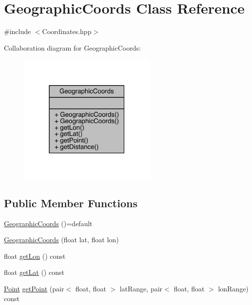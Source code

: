 \hypertarget{class_geographic_coords}{}\section{Geographic\+Coords Class Reference}
\label{class_geographic_coords}


{\ttfamily \#include $<$Coordinates.\+hpp$>$}



Collaboration diagram for Geographic\+Coords\+:\nopagebreak
\begin{figure}[H]
\begin{center}
\leavevmode
\includegraphics[width=195pt]{class_geographic_coords__coll__graph}
\end{center}
\end{figure}
\subsection*{Public Member Functions}
\begin{DoxyCompactItemize}
\item 
\hyperlink{class_geographic_coords_a6e58da78d507551dc7a6c39e6ffb33b3}{Geographic\+Coords} ()=default
\item 
\hyperlink{class_geographic_coords_a5db8168e8754a1eb2d13e3d2c8318cb4}{Geographic\+Coords} (float lat, float lon)
\item 
float \hyperlink{class_geographic_coords_a4e59f2e3ea261e73c33014368770ad21}{get\+Lon} () const
\item 
float \hyperlink{class_geographic_coords_ab2fa1d7cde50be2a00c297caa302297a}{get\+Lat} () const
\item 
\hyperlink{class_point}{Point} \hyperlink{class_geographic_coords_aa333be28efcee6d8da24adabe5cd5594}{get\+Point} (pair$<$ float, float $>$ lat\+Range, pair$<$ float, float $>$ lon\+Range) const
\end{DoxyCompactItemize}
